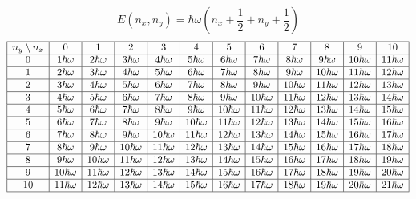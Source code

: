 \documentclass[letter, 10pts]{article}
\newcommand{\hb}{\hbar}
\begin{document}
\[
E(n_x, n_y) = \hb \omega \left(n_x + \frac{1}{2} + n_y + \frac{1}{2}\right)
\] 
\[
\begin{array}{|c|c|c|c|c|c|c|c|c|c|c|c|}
\hline
n_y \setminus n_x & 0 & 1 & 2 & 3 & 4 & 5 & 6 & 7 & 8 & 9 & 10 \\ \hline
0 & 1\hbar\omega & 2\hbar\omega & 3\hbar\omega & 4\hbar\omega & 5\hbar\omega & 6\hbar\omega & 7\hbar\omega & 8\hbar\omega & 9\hbar\omega & 10\hbar\omega & 11\hbar\omega \\ \hline
1 & 2\hbar\omega & 3\hbar\omega & 4\hbar\omega & 5\hbar\omega & 6\hbar\omega & 7\hbar\omega & 8\hbar\omega & 9\hbar\omega & 10\hbar\omega & 11\hbar\omega & 12\hbar\omega \\ \hline
2 & 3\hbar\omega & 4\hbar\omega & 5\hbar\omega & 6\hbar\omega & 7\hbar\omega & 8\hbar\omega & 9\hbar\omega & 10\hbar\omega & 11\hbar\omega & 12\hbar\omega & 13\hbar\omega \\ \hline
3 & 4\hbar\omega & 5\hbar\omega & 6\hbar\omega & 7\hbar\omega & 8\hbar\omega & 9\hbar\omega & 10\hbar\omega & 11\hbar\omega & 12\hbar\omega & 13\hbar\omega & 14\hbar\omega \\ \hline
4 & 5\hbar\omega & 6\hbar\omega & 7\hbar\omega & 8\hbar\omega & 9\hbar\omega & 10\hbar\omega & 11\hbar\omega & 12\hbar\omega & 13\hbar\omega & 14\hbar\omega & 15\hbar\omega \\ \hline
5 & 6\hbar\omega & 7\hbar\omega & 8\hbar\omega & 9\hbar\omega & 10\hbar\omega & 11\hbar\omega & 12\hbar\omega & 13\hbar\omega & 14\hbar\omega & 15\hbar\omega & 16\hbar\omega \\ \hline
6 & 7\hbar\omega & 8\hbar\omega & 9\hbar\omega & 10\hbar\omega & 11\hbar\omega & 12\hbar\omega & 13\hbar\omega & 14\hbar\omega & 15\hbar\omega & 16\hbar\omega & 17\hbar\omega \\ \hline
7 & 8\hbar\omega & 9\hbar\omega & 10\hbar\omega & 11\hbar\omega & 12\hbar\omega & 13\hbar\omega & 14\hbar\omega & 15\hbar\omega & 16\hbar\omega & 17\hbar\omega & 18\hbar\omega \\ \hline
8 & 9\hbar\omega & 10\hbar\omega & 11\hbar\omega & 12\hbar\omega & 13\hbar\omega & 14\hbar\omega & 15\hbar\omega & 16\hbar\omega & 17\hbar\omega & 18\hbar\omega & 19\hbar\omega \\ \hline
9 & 10\hbar\omega & 11\hbar\omega & 12\hbar\omega & 13\hbar\omega & 14\hbar\omega & 15\hbar\omega & 16\hbar\omega & 17\hbar\omega & 18\hbar\omega & 19\hbar\omega & 20\hbar\omega \\ \hline
10 & 11\hbar\omega & 12\hbar\omega & 13\hbar\omega & 14\hbar\omega & 15\hbar\omega & 16\hbar\omega & 17\hbar\omega & 18\hbar\omega & 19\hbar\omega & 20\hbar\omega & 21\hbar\omega \\ \hline
\end{array}
\]
\end{document}
